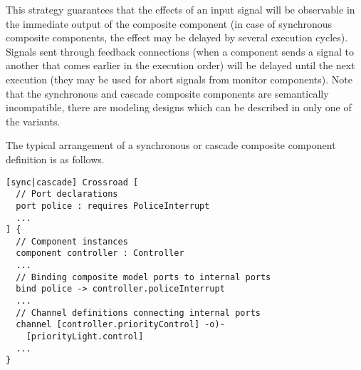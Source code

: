 This strategy guarantees that the effects of an input signal will be observable in the immediate output of the composite component (in case of synchronous composite components, the effect may be delayed by several execution cycles). Signals sent through feedback connections (\ie when a component sends a signal to another that comes earlier in the execution order) will be delayed until the next execution (they may be used for \eg abort signals from monitor components). Note that the synchronous and cascade composite components are semantically incompatible, \ie there are modeling designs which can be described in only one of the variants.

The typical arrangement of a synchronous or cascade composite component definition is as follows.
\begin{lstlisting}
[sync|cascade] Crossroad [
  // Port declarations
  port police : requires PoliceInterrupt
  ...
] {
  // Component instances
  component controller : Controller
  ...
  // Binding composite model ports to internal ports
  bind police -> controller.policeInterrupt
  ...
  // Channel definitions connecting internal ports
  channel [controller.priorityControl] -o)-
    [priorityLight.control]
  ...
}
\end{lstlisting}

